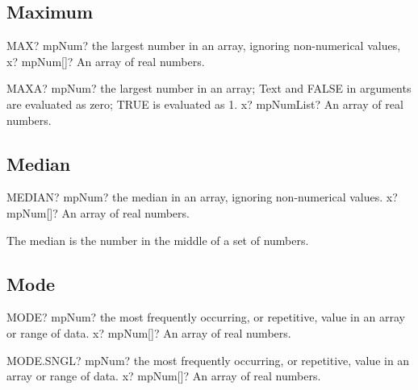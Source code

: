 \subsection{Maximum}

\begin{mpFunctionsExtract}
	\mpWorksheetFunctionOneNotImplemented
	{MAX? mpNum? the largest number in an array, ignoring non-numerical values,}
	{x? mpNum[]? An array of real numbers.}
\end{mpFunctionsExtract}


\vspace{0.6cm}
\begin{mpFunctionsExtract}
	\mpWorksheetFunctionOneNotImplemented
	{MAXA? mpNum? the largest number in an array; Text and FALSE in arguments are evaluated as zero; TRUE is evaluated as 1.}
	{x? mpNumList? An array of real numbers.}
\end{mpFunctionsExtract}





\subsection{Median}

\begin{mpFunctionsExtract}
	\mpWorksheetFunctionOneNotImplemented
	{MEDIAN? mpNum? the median in an array, ignoring non-numerical values.}
	{x? mpNum[]? An array of real numbers.}
\end{mpFunctionsExtract}

\vspace{0.3cm}
The median is the number in the middle of a set of numbers.






\subsection{Mode}


\begin{mpFunctionsExtract}
	\mpWorksheetFunctionOneNotImplemented
	{MODE? mpNum? the most frequently occurring, or repetitive, value in an array or range of data.}
	{x? mpNum[]? An array of real numbers.}
\end{mpFunctionsExtract}

\vspace{0.6cm}
\begin{mpFunctionsExtract}
	\mpWorksheetFunctionOneNotImplemented
	{MODE.SNGL? mpNum? the most frequently occurring, or repetitive, value in an array or range of data.}
	{x? mpNum[]? An array of real numbers.}
\end{mpFunctionsExtract}



